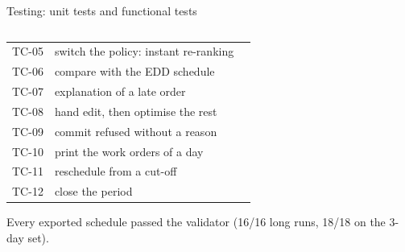 \begin{frame}{Testing: unit tests and functional tests}
\begin{columns}[T]
\begin{column}{0.44\textwidth}
\begin{tabular}{@{}lL{3.7cm}l@{}}
TC-05 & switch the policy: instant re-ranking & \\
TC-06 & compare with the EDD schedule & \\
TC-07 & explanation of a late order & \\
TC-08 & hand edit, then optimise the rest & \\
TC-09 & commit refused without a reason & \\
TC-10 & print the work orders of a day & \\
TC-11 & reschedule from a cut-off & \\
TC-12 & close the period & \\
\bottomrule
\end{tabular}
\vspace{0.3em}

\scriptsize Every exported schedule passed the validator (16/16 long runs, 18/18 on the 3-day set).
\end{column}
\end{columns}
\end{frame}

